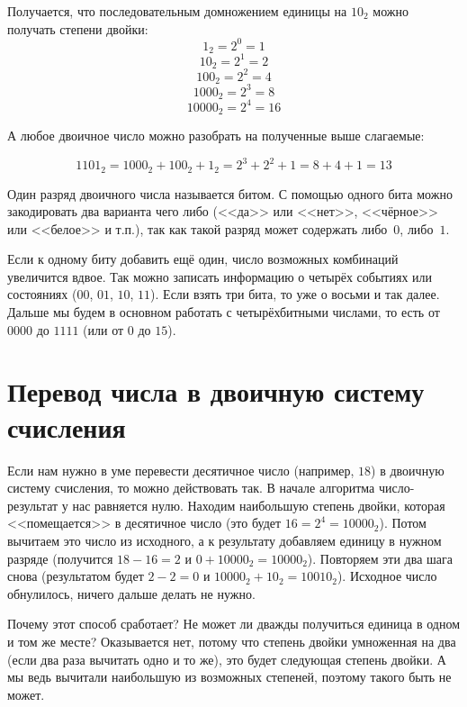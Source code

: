 Получается, что последовательным домножением единицы на $10_2$ можно получать степени двойки:
$$1_2=2^0=1$$
$$10_2=2^1=2$$
$$100_2=2^2=4$$
$$1000_2=2^3=8$$
$$10000_2=2^4=16$$

А любое двоичное число можно разобрать на полученные выше слагаемые:

$$1101_2=1000_2+100_2+1_2=2^3+2^2+1=8+4+1=13$$

Один разряд двоичного числа называется битом. С помощью одного бита можно закодировать
два варианта чего либо (<<да>> или <<нет>>, <<чёрное>> или <<белое>> и т.п.),
так как такой разряд может содержать либо~$0$, либо~$1$.


Если к одному биту добавить ещё один, число возможных комбинаций увеличится
вдвое. Так можно записать информацию о четырёх событиях или состояниях ($00$, $01$, $10$, $11$).
Если взять три бита, то уже о восьми и так далее. Дальше мы будем в основном работать с четырёхбитными
числами, то есть от $0000$ до $1111$ (или от $0$ до $15$).


\section{Перевод числа в двоичную систему счисления}

Если нам нужно в уме перевести десятичное число (например, $18$) в двоичную систему счисления,
то можно действовать так. В начале алгоритма число-результат у нас равняется нулю.
Находим наибольшую степень двойки, которая <<помещается>> в десятичное число (это будет $16=2^4=10000_2$).
Потом вычитаем это число из исходного, а к результату добавляем единицу в нужном разряде
(получится $18-16=2$ и $0+10000_2=10000_2$).
Повторяем эти два шага снова (результатом будет $2-2=0$ и $10000_2+10_2=10010_2$). Исходное число обнулилось,
ничего дальше делать не нужно.

Почему этот способ сработает? Не может ли дважды получиться единица в одном и том же месте?
Оказывается нет, потому что степень двойки умноженная на два (если два раза вычитать одно и то же),
это будет следующая степень двойки. А мы ведь вычитали наибольшую из возможных степеней, поэтому
такого быть не может.

